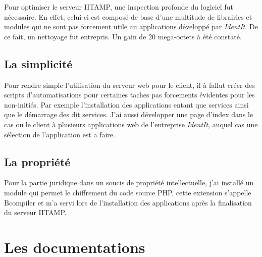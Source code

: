 Pour optimiser le serveur IITAMP, une inspection profonde du logiciel
fut nécessaire. En effet, celui-ci est composé de base d'une multitude de
librairies et modules qui ne sont pas forcement utile au applications
développé par \emph{IdentIt}. De ce fait, un nettoyage fut entrepris. Un
gain de 20 mega-octets à été constaté.

\subsection{La simplicité} %
\label{sub:La simplicité}

Pour rendre simple l'utilisation du serveur web pour le client, il à
fallut créer des scripts d'automatisations pour certaines taches pas
forcements évidentes pour les non-initiés. Par exemple l'installation des
applications entant que services ainsi que le démarrage des dit services.
J'ai aussi développer une page d'index dans le cas ou le client à
plusieurs applications web de l'entreprise \emph{IdentIt}, auquel cas une
sélection de l'application est a faire.

\subsection{La propriété} %
\label{sub:La propriété}

Pour la partie juridique dans un soucis de propriété intellectuelle,
j'ai installé un module qui permet le chiffrement du code source PHP,
cette extension s'appelle Bcompiler et m'a servi lors de l'installation
des applications après la finalisation du serveur IITAMP.

\section{Les documentations} %
\label{sec:Les documentations}

